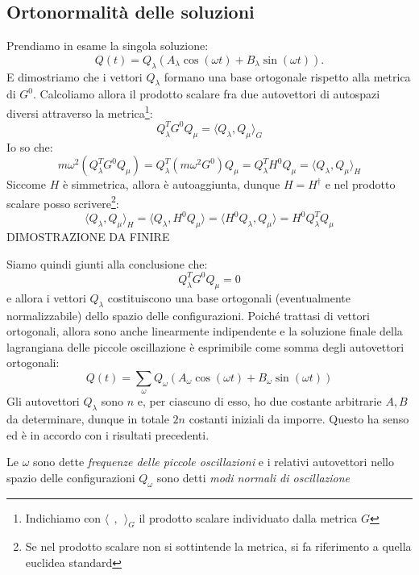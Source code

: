 \documentclass[a4paper,openany]{article}
\begin{document}
	\subsection{Ortonormalità delle soluzioni}
	Prendiamo in esame la singola soluzione:
	$$
	Q(t) = Q_{\lambda}(A_{\lambda}\cos(\omega t)+B_{\lambda}\sin(\omega t)).
	$$
	E dimostriamo che i vettori $Q_{\lambda}$ formano una base ortogonale rispetto alla metrica di $G^{0}$. Calcoliamo allora il prodotto scalare fra due autovettori di autospazi diversi attraverso la metrica\footnote{Indichiamo con $\langle \>\>,\>\>\rangle_{G}$ il prodotto scalare individuato dalla metrica $G$}:
	\begin{equation}\label{key}
		Q_{\lambda}^{T}G^{0}Q_{\mu} = \langle Q_{\lambda},Q_{\mu} \rangle_{G}
	\end{equation}
	Io so che:
	$$
	m\omega^{2}(Q_{\lambda}^{T}G^{0}Q_{\mu}) = Q_{\lambda}^{T}(m\omega^{2}G^{0})Q_{\mu} = Q_{\lambda}^{T}H^{0}Q_{\mu} = \langle Q_{\lambda},Q_{\mu} \rangle_{H}
	$$
	Siccome $H$ è simmetrica, allora è autoaggiunta, dunque $H= H^{\dagger}$ e nel prodotto scalare posso scrivere\footnote{Se nel prodotto scalare non si sottintende la metrica, si fa riferimento a quella euclidea standard}:
	$$
	\langle Q_{\lambda},Q_{\mu} \rangle_{H} = \langle Q_{\lambda},H^{0}Q_{\mu} \rangle = \langle H^{0}Q_{\lambda},Q_{\mu} \rangle = H^{0}Q_{\lambda}^{T}Q_{\mu}
	$$
	DIMOSTRAZIONE DA FINIRE
	
	Siamo quindi giunti alla conclusione che:
	$$
	Q_{\lambda}^{T}G^{0}Q_{\mu} = 0
	$$
	e allora i vettori $Q_{\lambda}$ costituiscono una base ortogonali (eventualmente normalizzabile) dello spazio delle configurazioni. Poiché trattasi di vettori ortogonali, allora sono anche linearmente indipendente e la soluzione finale della lagrangiana delle piccole oscillazione è esprimibile come somma degli autovettori ortogonali:
	\begin{equation}\label{key}
		Q(t) = \sum_{\omega}Q_{\omega}(A_{\omega}\cos(\omega t)+B_{\omega}\sin(\omega t))
	\end{equation}
	Gli autovettori $Q_{\lambda}$ sono $n$ e, per ciascuno di esso, ho due costante arbitrarie $A,B$ da determinare, dunque in totale $2n$ costanti iniziali da imporre. Questo ha senso ed è in accordo con i risultati precedenti.
	
	Le $\omega$ sono dette \textit{frequenze delle piccole oscillazioni} e i relativi autovettori nello spazio delle configurazioni $Q_{\omega}$ sono detti \textit{modi normali di oscillazione}
\end{document}
